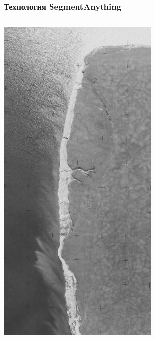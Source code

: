 \documentclass[handout]{beamer}
\begin{document}
\begin{frame}
  \frametitle{Технология SegmentAnything}
  \begin{columns}
    \begin{column}{0.25\linewidth}
      \includegraphics[width=1\linewidth]{photo-source.png}

\end{column}
\end{columns}
\end{frame}
\end{document}
